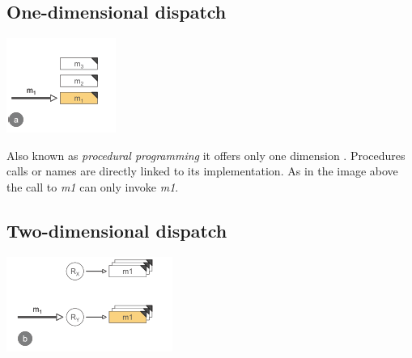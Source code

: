 \documentclass[journal,10pt,compsoc]{IEEEtran}
\begin{document}
\subsection{One-dimensional dispatch}
\label{sec:org9df8cc4}

\begin{center}
\includegraphics[width=.9\linewidth]{./one.png}
\end{center}

Also known as \emph{procedural programming} it offers only one dimension \cite{smith1996simple}. Procedures calls or names are directly linked to its implementation.
As in the image above the call to \emph{m1} can only invoke \emph{m1}.

\subsection{Two-dimensional dispatch}
\label{sec:org9055d9b}

\begin{center}
\includegraphics[width=.9\linewidth]{./two.png}
\end{center}
\end{document}
